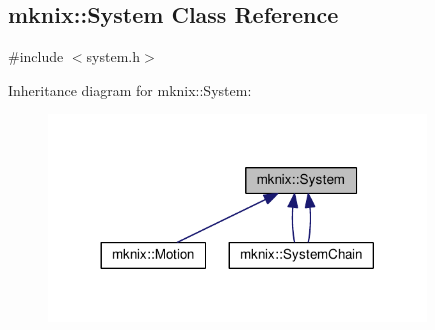 \hypertarget{classmknix_1_1_system}{}\subsection{mknix\+:\+:System Class Reference}
\label{classmknix_1_1_system}


{\ttfamily \#include $<$system.\+h$>$}



Inheritance diagram for mknix\+:\+:System\+:\nopagebreak
\begin{figure}[H]
\begin{center}
\leavevmode
\includegraphics[width=284pt]{d3/dcf/classmknix_1_1_system__inherit__graph}
\end{center}
\end{figure}
